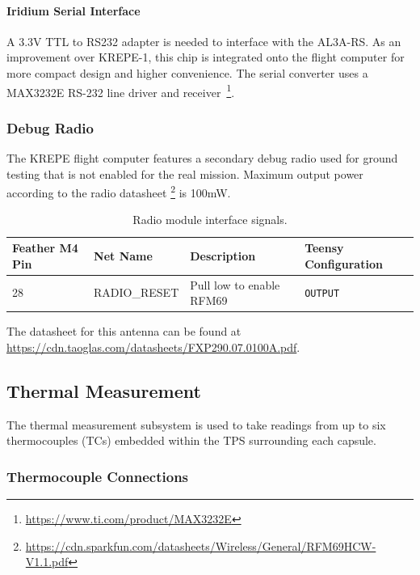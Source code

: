 \documentclass{article}
\begin{document}
\paragraph{Iridium Serial Interface}

A 3.3V TTL to RS232 adapter is needed to interface with the AL3A-RS. As an improvement over KREPE-1, this chip is integrated onto the flight computer for more compact design and higher convenience. The serial converter uses a  MAX3232E RS-232 line driver and receiver~\footnote{\url{https://www.ti.com/product/MAX3232E}}.



\subsubsection{Debug Radio}
The KREPE flight computer features a secondary debug radio used for ground testing that is not enabled for the real mission.  Maximum output power according to the radio datasheet \footnote{\url{https://cdn.sparkfun.com/datasheets/Wireless/General/RFM69HCW-V1.1.pdf}} is 100mW.
\begin{table}[H]
	\centering
	\caption{Radio module interface signals.}
	\label{tab:pins_radio}
	\begin{tabular}{l|l|l|l}
		Feather M4 Pin & Net Name  & Description   & Teensy Configuration \\
		\hline 
		28 & RADIO\_RESET  &  Pull low to enable RFM69   & \texttt{OUTPUT} 
	\end{tabular}
\end{table}
The datasheet for this antenna can be found at  \url{https://cdn.taoglas.com/datasheets/FXP290.07.0100A.pdf}. 
  


\subsection{Thermal Measurement}
The thermal measurement subsystem is used to take readings from up to six thermocouples (TCs) embedded within the TPS surrounding each capsule. 

\subsubsection{Thermocouple Connections}
\end{document}

